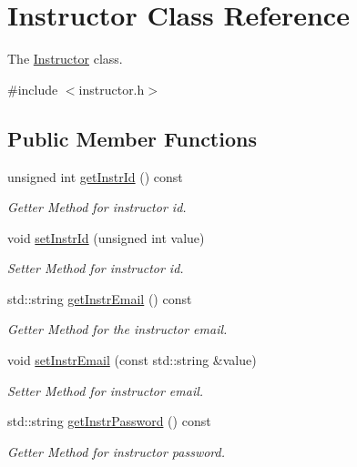 \hypertarget{classInstructor}{}\section{Instructor Class Reference}
\label{classInstructor}


The \hyperlink{classInstructor}{Instructor} class.  




{\ttfamily \#include $<$instructor.\+h$>$}

\subsection*{Public Member Functions}
\begin{DoxyCompactItemize}
\item 
unsigned int \hyperlink{classInstructor_a4dcf1f8643b542dd53208f02ca5a16a8}{get\+Instr\+Id} () const
\begin{DoxyCompactList}\small\item\em Getter Method for instructor id. \end{DoxyCompactList}\item 
void \hyperlink{classInstructor_a836c0cb8195550308e7dcc04c7b767a2}{set\+Instr\+Id} (unsigned int value)
\begin{DoxyCompactList}\small\item\em Setter Method for instructor id. \end{DoxyCompactList}\item 
std\+::string \hyperlink{classInstructor_a3f0a855ee446bd6db6b5a0e2133da3ac}{get\+Instr\+Email} () const
\begin{DoxyCompactList}\small\item\em Getter Method for the instructor email. \end{DoxyCompactList}\item 
void \hyperlink{classInstructor_a7983774764662f501ecda887e97038f3}{set\+Instr\+Email} (const std\+::string \&value)
\begin{DoxyCompactList}\small\item\em Setter Method for instructor email. \end{DoxyCompactList}\item 
std\+::string \hyperlink{classInstructor_a72e6160b964d0abdc3867a6eab817993}{get\+Instr\+Password} () const
\begin{DoxyCompactList}\small\item\em Getter Method for instructor password. \end{DoxyCompactList}\item 

\end{DoxyCompactItemize}
